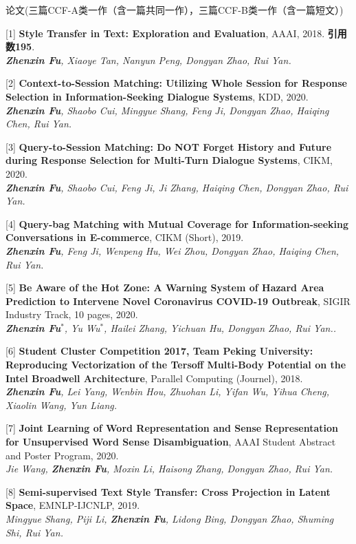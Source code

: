 \documentclass{resume} %
\begin{document}
\begin{rSection}{论文(三篇CCF-A类一作（含一篇共同一作），三篇CCF-B类一作（含一篇短文）)}
    
    [1] \textbf{Style Transfer in Text: Exploration and Evaluation}, AAAI, 2018. \textbf{引用数195}.\\
    {\it \textbf{Zhenxin Fu}, Xiaoye Tan, Nanyun Peng, Dongyan Zhao, Rui Yan.}
  
    [2] \textbf{Context-to-Session Matching: Utilizing Whole Session for Response Selection in Information-Seeking Dialogue Systems}, KDD, 2020. \\
    {\it \textbf{Zhenxin Fu}, Shaobo Cui, Mingyue Shang, Feng Ji, Dongyan Zhao, Haiqing Chen, Rui Yan.}

    [3] \textbf{Query-to-Session Matching: Do NOT Forget History and Future during Response Selection for Multi-Turn Dialogue Systems}, CIKM, 2020. \\
    {\it \textbf{Zhenxin Fu}, Shaobo Cui, Feng Ji, Ji Zhang, Haiqing Chen, Dongyan Zhao, Rui Yan.}
    
    [4] \textbf{Query-bag Matching with Mutual Coverage for Information-seeking Conversations in E-commerce}, CIKM (Short), 2019. \\
    {\it \textbf{Zhenxin Fu}, Feng Ji, Wenpeng Hu, Wei Zhou, Dongyan Zhao, Haiqing Chen, Rui Yan.}

    [5] \textbf{Be Aware of the Hot Zone: A Warning System of Hazard Area Prediction to Intervene Novel Coronavirus COVID-19 Outbreak}, SIGIR Industry Track, 10 pages, 2020. \\
    {\it \textbf{Zhenxin Fu}$^*$, Yu Wu$^*$, Hailei Zhang, Yichuan Hu, Dongyan Zhao, Rui Yan..}

    [6] \textbf{Student Cluster Competition 2017, Team Peking University: Reproducing Vectorization of the Tersoff Multi-Body Potential on the Intel Broadwell Architecture}, Parallel Computing (Journel), 2018. \\
    {\it \textbf{Zhenxin Fu}, Lei Yang, Wenbin Hou, Zhuohan Li, Yifan Wu, Yihua Cheng, Xiaolin Wang, Yun Liang.}

    [7] \textbf{Joint Learning of Word Representation and Sense Representation for Unsupervised Word Sense Disambiguation}, AAAI Student Abstract and Poster Program, 2020. \\
    {\it Jie Wang, \textbf{Zhenxin Fu}, Moxin Li, Haisong Zhang, Dongyan Zhao, Rui Yan.}

    [8] \textbf{Semi-supervised Text Style Transfer: Cross Projection in Latent Space}, EMNLP-IJCNLP, 2019. \\
    {\it Mingyue Shang, Piji Li, \textbf{Zhenxin Fu}, Lidong Bing, Dongyan Zhao, Shuming Shi, Rui Yan.}


\end{rSection}
\end{document}
